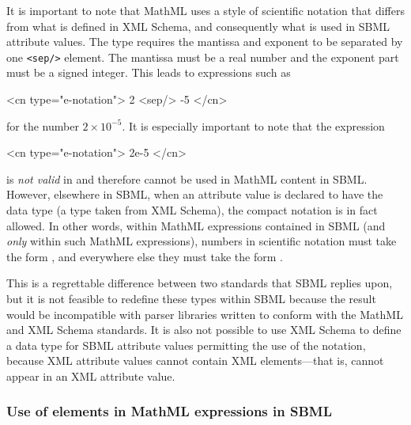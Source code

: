 It is important to note that MathML uses a style of scientific
notation that differs from what is defined in XML Schema, and
consequently what is used in SBML attribute values.  The
\mathmltwo type  requires the mantissa and
exponent to be separated by one \texttt{<sep/>} element.  The
mantissa must be a real number and the exponent part must be a
signed integer.  This leads to expressions such as

\begin{example}
<cn type="e-notation"> 2 <sep/> -5 </cn>
\end{example}

for the number $2 \times 10^{-5}$.  It is especially
important to note that the expression

\begin{example}
<cn type="e-notation"> 2e-5 </cn>
\end{example}

is \emph{not valid} in \mathmltwo and therefore cannot be used in
MathML content in SBML.  However, elsewhere in SBML, when an
attribute value is declared to have the data type
 (a type taken from XML Schema), the compact
notation  is in fact allowed.  In other words, within
MathML expressions contained in SBML (and \emph{only} within such
MathML expressions), numbers in scientific notation must take the
form , and
everywhere else they must take the form .

This is a regrettable difference between two standards that SBML
replies upon, but it is not feasible to redefine these types
within SBML because the result would be incompatible with parser
libraries written to conform with the MathML and XML Schema
standards.  It is also not possible to use XML Schema to define a
data type for SBML attribute values permitting the use of the
 notation, because XML attribute values cannot
contain XML elements---that is,  cannot appear in an
XML attribute value.


\subsubsection{Use of  elements in MathML expressions in SBML}
\label{sec:ci-token}

